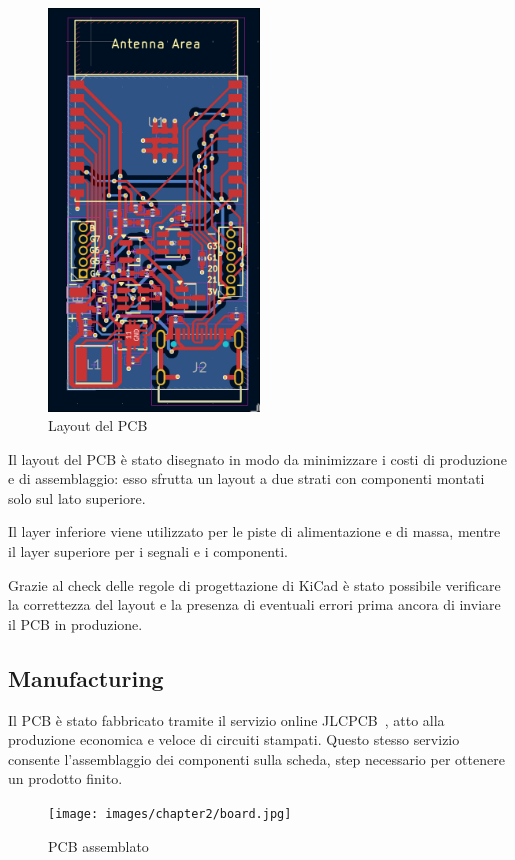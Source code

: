 \begin{figure}[H]
  \centering
  \includegraphics[width=0.5\textwidth]{images/chapter2/pcb.png}
  \caption{Layout del PCB}
  \label{fig:pcb}
\end{figure}

Il layout del PCB è stato disegnato in modo da minimizzare i costi di produzione e di assemblaggio:
esso sfrutta un layout a due strati con componenti montati solo sul lato superiore.

Il layer inferiore viene utilizzato per le piste di alimentazione e di massa, mentre il layer superiore 
per i segnali e i componenti.

Grazie al check delle regole di progettazione di KiCad è stato possibile verificare la correttezza del 
layout e la presenza di eventuali errori prima ancora di inviare il PCB in produzione.
\subsection{Manufacturing}

Il PCB è stato fabbricato tramite il servizio online JLCPCB~\cite{jlcpcb}, atto alla produzione economica e veloce di circuiti stampati.
Questo stesso servizio consente l'assemblaggio dei componenti sulla scheda, step necessario per ottenere un prodotto finito.

\begin{figure}[H]
  \centering
  \texttt{[image: images/chapter2/board.jpg]}
  \caption{PCB assemblato}
  \label{fig:board}
\end{figure}

